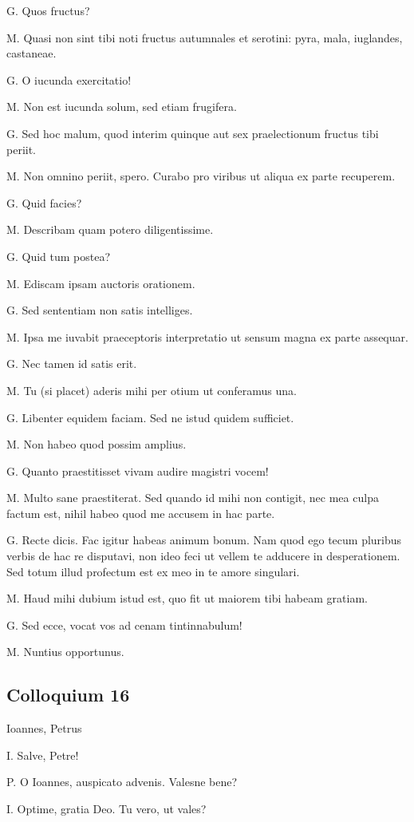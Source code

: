 \documentclass{article}
\begin{document}
G. Quos fructus?

M. Quasi non sint tibi noti fructus autumnales et serotini: pyra, mala, iuglandes, castaneae.

G. O iucunda exercitatio!

M. Non est iucunda solum, sed etiam frugifera.

G. Sed hoc malum, quod interim quinque aut sex praelectionum fructus tibi periit.

M. Non omnino periit, spero. Curabo pro viribus ut aliqua ex parte recuperem.

G. Quid facies?

M. Describam quam potero diligentissime.

G. Quid tum postea?

M. Ediscam ipsam auctoris orationem.

G. Sed sententiam non satis intelliges.

M. Ipsa me iuvabit praeceptoris interpretatio ut sensum magna ex parte assequar.

G. Nec tamen id satis erit.

M. Tu (si placet) aderis mihi per otium ut conferamus una.

G. Libenter equidem faciam. Sed ne istud quidem sufficiet.

M. Non habeo quod possim amplius.

G. Quanto praestitisset vivam audire magistri vocem!

M. Multo sane praestiterat. Sed quando id mihi non contigit, nec mea culpa factum est, nihil habeo quod me accusem in hac parte.

G. Recte dicis. Fac igitur habeas animum bonum. Nam quod ego tecum pluribus verbis de hac re disputavi, non ideo feci ut vellem te adducere in desperationem. Sed totum illud profectum est ex meo in te amore singulari.

M. Haud mihi dubium istud est, quo fit ut maiorem tibi habeam gratiam.

G. Sed ecce, vocat vos ad cenam tintinnabulum!

M. Nuntius opportunus.

\subsection{Colloquium 16}
Ioannes, Petrus

I. Salve, Petre!

P. O Ioannes, auspicato advenis. Valesne bene?

I. Optime, gratia Deo. Tu vero, ut vales?
\end{document}
